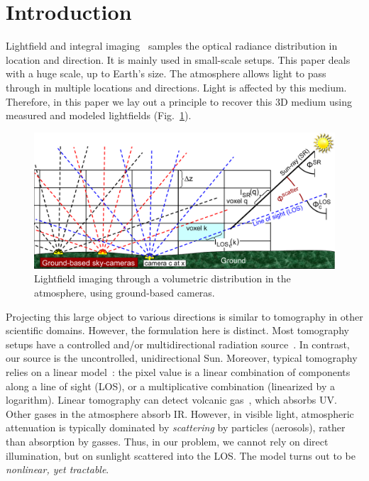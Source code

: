 \documentclass[10pt,letterpaper]{article}
\begin{document}
{}



\section{Introduction}
\label{sec:intro}

Lightfield and integral imaging~\cite{bishop,horstmeyer,kim,Ng1948}
samples the optical radiance distribution in location and
direction. It is mainly used in small-scale setups. This paper deals
with a huge scale, up to Earth's size.  The atmosphere allows light to
pass through in multiple locations and directions. Light is affected
by this medium. Therefore, in this paper we lay out a principle to
recover this 3D medium using measured and modeled lightfields
(Fig.~\ref{fig:groundgrid}).
\begin{figure}[t!]
  \begin{center}
    \includegraphics[width=\linewidth]{images/groundtomog24.pdf}
  \end{center}
  \caption{\small Lightfield imaging through a volumetric distribution
    in the atmosphere, using ground-based cameras.}
  \label{fig:groundgrid}
\end{figure}
Projecting this large object to various directions is similar to
tomography in other scientific domains. However, the formulation here
is distinct. Most tomography setups have a controlled and/or
multidirectional radiation source~\cite{gorbunov,messer}. In contrast,
our source is the uncontrolled, unidirectional Sun. Moreover, typical
tomography relies on a linear model~\cite{gregson}: the pixel value is
a linear combination of components along a line of sight (LOS), or a
multiplicative combination (linearized by a logarithm). Linear
tomography can detect volcanic gas~\cite{wright}, which absorbs
UV. Other gases in the atmosphere absorb IR. However, in visible
light, atmospheric attenuation is typically dominated by {\em
  scattering} by particles (aerosols), rather than absorption by
gasses. Thus, in our problem, we cannot rely on direct illumination,
but on sunlight scattered into the LOS.  The model turns out to be
{\em nonlinear, yet tractable}.
\end{document}
